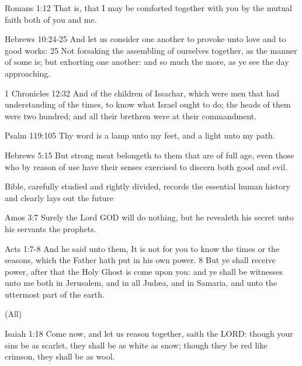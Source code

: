 \begin{compactenum}[I.]
\begin{compactenum}[A.]
		\item Romans 1:12 That is, that I may be comforted together with you by the mutual faith both of you and me.
		\item Hebrews 10:24-25 And let us consider one another to provoke unto love and to good works: 25 Not forsaking the assembling of ourselves together, as the manner of some is; but exhorting one another: and so much the more, as ye see the day approaching.
    \end{compactenum}
    \item {}
        \begin{compactenum}[A.]
        	\item 1 Chronicles 12:32 And of the children of Issachar, which were men that had understanding of the times, to know what Israel ought to do; the heads of them were two hundred; and all their brethren were at their commandment.
        	\item Psalm 119:105 Thy word is a lamp unto my feet, and a light unto my path.
        	\item Hebrews 5:15 But strong meat belongeth to them that are of full age, even those who by reason of use have their senses exercised to discern both good and evil.
           \end{compactenum}
     \item {} Bible, carefully studied and rightly divided, records the essential human history and clearly lays out the future
    \begin{compactenum}[A.]
    	\item Amos 3:7 Surely the Lord GOD will do nothing, but he revealeth his secret unto his servants the prophets.
    	\item Acts 1:7-8 And he said unto them, It is not for you to know the times or the seasons, which the Father hath put in his own power. 8 But ye shall receive power, after that the Holy Ghost is come upon you: and ye shall be witnesses unto me both in Jerusalem, and in all Judæa, and in Samaria, and unto the uttermost part of the earth.
    \end{compactenum}
    \item {} (All)
    \begin{compactenum}[A.]
    	\item Isaiah 1:18  Come now, and let us reason together, saith the LORD: though your sins be as scarlet, they shall be as white as snow; though they be red like crimson, they shall be as wool.

\end{compactenum}
\end{compactenum}
